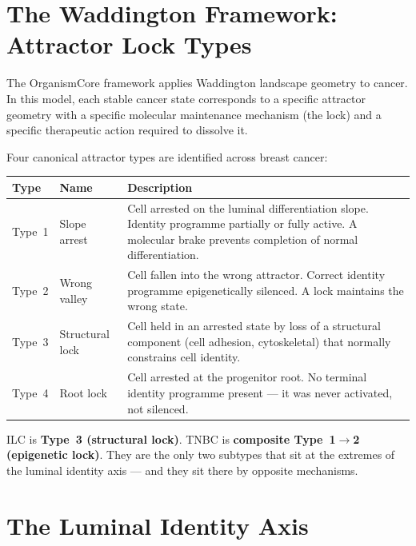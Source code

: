 \documentclass[12pt, a4paper]{article}
\begin{document}
\section{The Waddington Framework: Attractor
Lock Types}

The OrganismCore framework applies Waddington landscape
geometry to cancer. In this model, each stable cancer
state corresponds to a specific attractor geometry with
a specific molecular maintenance mechanism (the lock)
and a specific therapeutic action required to dissolve
it.

Four canonical attractor types are identified across
breast cancer:

\begin{center}
\begin{tabular}{p{1.5cm}p{2.5cm}p{8cm}}
\toprule
\textbf{Type} & \textbf{Name} & \textbf{Description} \\
\midrule
Type~1 &
Slope arrest &
Cell arrested on the luminal differentiation slope.
Identity programme partially or fully active.
A molecular brake prevents completion of normal
differentiation. \\[0.4em]
Type~2 &
Wrong valley &
Cell fallen into the wrong attractor.
Correct identity programme epigenetically silenced.
A lock maintains the wrong state. \\[0.4em]
Type~3 &
Structural lock &
Cell held in an arrested state by loss of a
structural component (cell adhesion, cytoskeletal)
that normally constrains cell identity. \\[0.4em]
Type~4 &
Root lock &
Cell arrested at the progenitor root.
No terminal identity programme present ---
it was never activated, not silenced. \\
\bottomrule
\end{tabular}
\end{center}

ILC is \textbf{Type~3 (structural lock)}. TNBC is
\textbf{composite Type~1$\rightarrow$2 (epigenetic
lock)}. They are the only two subtypes that sit at
the extremes of the luminal identity axis --- and
they sit there by opposite mechanisms.

\section{The Luminal Identity Axis}
\end{document}
